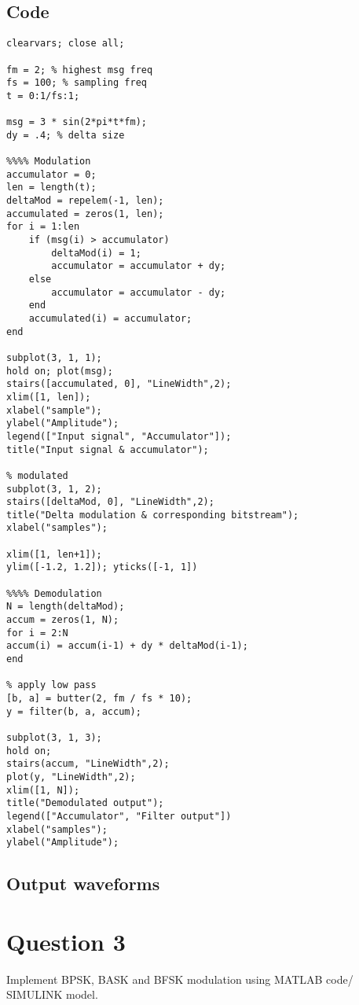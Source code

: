 \documentclass[12pt,a4paper]{report}
\begin{document}
\subsection*{Code}

\begin{verbatim}
clearvars; close all;

fm = 2; % highest msg freq
fs = 100; % sampling freq
t = 0:1/fs:1;

msg = 3 * sin(2*pi*t*fm);
dy = .4; % delta size

%%%% Modulation
accumulator = 0;
len = length(t);
deltaMod = repelem(-1, len);
accumulated = zeros(1, len);
for i = 1:len
    if (msg(i) > accumulator)
        deltaMod(i) = 1;
        accumulator = accumulator + dy;
    else
        accumulator = accumulator - dy;
    end
    accumulated(i) = accumulator;
end

subplot(3, 1, 1);
hold on; plot(msg);
stairs([accumulated, 0], "LineWidth",2);
xlim([1, len]);
xlabel("sample");
ylabel("Amplitude");
legend(["Input signal", "Accumulator"]);
title("Input signal & accumulator");

% modulated
subplot(3, 1, 2);
stairs([deltaMod, 0], "LineWidth",2);
title("Delta modulation & corresponding bitstream");
xlabel("samples");

xlim([1, len+1]);
ylim([-1.2, 1.2]); yticks([-1, 1])

%%%% Demodulation
N = length(deltaMod);
accum = zeros(1, N);
for i = 2:N
accum(i) = accum(i-1) + dy * deltaMod(i-1);
end

% apply low pass
[b, a] = butter(2, fm / fs * 10);
y = filter(b, a, accum);

subplot(3, 1, 3);
hold on;
stairs(accum, "LineWidth",2);
plot(y, "LineWidth",2);
xlim([1, N]);
title("Demodulated output");
legend(["Accumulator", "Filter output"])
xlabel("samples");
ylabel("Amplitude");
\end{verbatim}

\subsection*{Output waveforms}
\begin{figure*}[!h]
    
\end{figure*}

\pagebreak
\section*{Question 3}
Implement BPSK, BASK and BFSK modulation using MATLAB code/ SIMULINK model.
\end{document}
